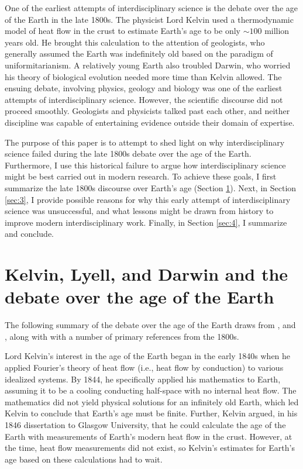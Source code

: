 \documentclass[12pt]{article}
\begin{document}
One of the earliest attempts of interdisciplinary science is the debate over the age of the Earth in the late 1800s. The physicist Lord Kelvin used a thermodynamic model of heat flow in the crust to estimate Earth's age to be only $\sim 100$ million years old. He brought this calculation to the attention of geologists, who generally assumed the Earth was indefinitely old based on the paradigm of uniformitarianism. A relatively young Earth also troubled Darwin, who worried his theory of biological evolution needed more time than Kelvin allowed. The ensuing debate, involving physics, geology and biology was one of the earliest attempts of interdisciplinary science. However, the scientific discourse did not proceed smoothly. Geologists and physicists talked past each other, and neither discipline was capable of entertaining evidence outside their domain of expertise.

The purpose of this paper is to attempt to shed light on why interdisciplinary science failed during the late 1800s debate over the age of the Earth. Furthermore, I use this historical failure to argue how interdisciplinary science might be best carried out in modern research. To achieve these goals, I first summarize the late 1800s discourse over Earth's age (Section \ref{sec:2}). Next, in Section \ref{sec:3}, I provide possible reasons for why this early attempt of interdisciplinary science was unsuccessful, and what lessons might be drawn from history to improve modern interdisciplinary work. Finally, in Section \ref{sec:4}, I summarize and conclude.

\section{Kelvin, Lyell, and Darwin and the debate over the age of the Earth} \label{sec:2}

The following summary of the debate over the age of the Earth draws from \citet{Lindley_2004}, \citet{Gould_1987} and \citet{Hallam_1989}, along with with a number of primary references from the 1800s.

Lord Kelvin's interest in the age of the Earth began in the early 1840s when he applied Fourier's theory of heat flow (i.e., heat flow by conduction) to various idealized systems. By 1844, he specifically applied his mathematics to Earth, assuming it to be a cooling conducting half-space with no internal heat flow. The mathematics did not yield physical solutions for an infinitely old Earth, which led Kelvin to conclude that Earth's age must be finite. Further, Kelvin argued, in his 1846 dissertation to Glasgow University, that he could calculate the age of the Earth with measurements of Earth's modern heat flow in the crust. However, at the time, heat flow measurements did not exist, so Kelvin's estimates for Earth's age based on these calculations had to wait.
\end{document}
